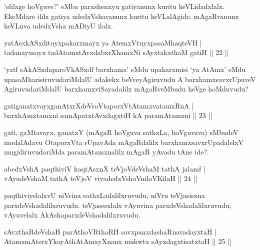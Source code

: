 \begin{artha}
`elilxge hoVguve?' eMba parxshenxyu gatiyanunx kuritu keVLidadxlalx. EkeMdare ililx gatiya udedxVshavanunx kuritu keVLalAgide. mAgaRvanunx keVLuva udedxVsha mADiyU ilalx.
\end{artha}


\begin{shl}
yatAsxkASxdituyxpakarxmayx ya AtemxVtuyxpasaMhaqteVH |\\
tadanayxsayx tadAtamxtAvxdabxrXhamxNi sAyxtakxthaM gatiH \hfill || 22 || 
\end{shl}

\begin{artha}
`yatf sAkASxdaparoVkASxdf barxhamx' eMdu upakarxmisi `ya AtAmx' eMdu upasaMharisiruvudariMdalU adakekx beVreyAgiruvudu A barxhamxsavxrUpaveV AgiruvudariMdalU barxhamxviSayadalilx mAgaRveMbudu heVge hoMduvudu?
\end{artha}

\begin{shl}
gatiganatxvayxganAtxrXdeVroVtaporxVtAtamxvatamxRnA |\\
barxhAmxtamxni samApatxtAvxdagxtiH kA paramAtamxni \hfill || 23 || 
\end{shl}

\begin{artha}
gati, gaMtavayx, ganatxY (mAgaR hoVguva sathxLa, hoVguvava) eMbudeV modalAdavu OtaporxVta rUpavAda mAgaRdalilx barxhamxsavxrUpadalelxV mugidiruvudariMda paramAtamxnalilx mAgaR yAvadu tAne ide?.
\end{artha}


\begin{shl}
abedxVshA paqthiviV kaqtAsxnX teVjoVdeVshaM tathA jalamf |\\
vAyudeVshaM tathA teVjoV viyadedxVshoV\s niloV\s KilaH \hfill || 24 || 
\end{shl}

\begin{artha}
paqthiviyelalxvU niVrina sathxLadalilxruvudu, niVru teVjasisxna parxdeVshadalilxruvudu. teVjasesxlalx vAyuvina parxdeVshadalilxruvudu, vAyuvelalx AkAshaparxdeVshadalilxruvudu.
\end{artha}

\begin{shl}
sAvxthaRdeVshaH parAthoVR\s thaRH savxpanxdashaRnavadayxtaH |\\
AtamxmAterxYkayAthAtAmxyXnanx mukwtx sAyxdagxtisatxtaH \hfill || 25 || 
\end{shl}

